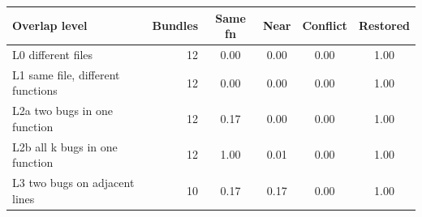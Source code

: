\begin{tabular}{@{}lrcccc@{}}
\toprule
Overlap level & Bundles & Same fn & Near & Conflict & Restored \\
\midrule
L0 different files & 12 & 0.00 & 0.00 & 0.00 & 1.00 \\
L1 same file, different functions & 12 & 0.00 & 0.00 & 0.00 & 1.00 \\
L2a two bugs in one function & 12 & 0.17 & 0.00 & 0.00 & 1.00 \\
L2b all k bugs in one function & 12 & 1.00 & 0.01 & 0.00 & 1.00 \\
L3 two bugs on adjacent lines & 10 & 0.17 & 0.17 & 0.00 & 1.00 \\
\bottomrule
\end{tabular}
